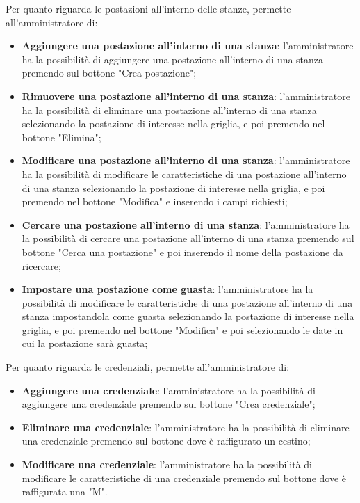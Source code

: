 Per quanto riguarda le postazioni all'interno delle stanze, permette all'amministratore di:
\begin{itemize}
	\item \textbf{Aggiungere una postazione all'interno di una stanza}: l'amministratore ha la possibilità di aggiungere una postazione all'interno di una stanza premendo sul bottone "Crea postazione"; \\
	\item \textbf{Rimuovere una postazione all'interno di una stanza}: l'amministratore ha la possibilità di eliminare una postazione all'interno di una stanza selezionando la postazione di interesse nella griglia, e poi premendo nel bottone "Elimina"; \\
	\item \textbf{Modificare una postazione all'interno di una stanza}:  l'amministratore ha la possibilità di modificare le caratteristiche di una postazione all'interno di una stanza selezionando la postazione di interesse nella griglia, e poi premendo nel bottone "Modifica" e inserendo i campi richiesti; \\
	\item \textbf{Cercare una postazione all'interno di una stanza}: l'amministratore ha la possibilità di cercare una postazione all'interno di una stanza premendo sul bottone "Cerca una postazione" e poi inserendo il nome della postazione da ricercare; \\
	\item \textbf{Impostare una postazione come guasta}:  l'amministratore ha la possibilità di modificare le caratteristiche di una postazione all'interno di una stanza impostandola come guasta selezionando la postazione di interesse nella griglia, e poi premendo nel bottone "Modifica" e poi selezionando le date in cui la postazione sarà guasta; \\
\end{itemize}
Per quanto riguarda le credenziali, permette all'amministratore di:
\begin{itemize}
	\item \textbf{Aggiungere una credenziale}: l'amministratore ha la possibilità di aggiungere una credenziale premendo sul bottone "Crea credenziale"; \\
	\item \textbf{Eliminare una credenziale}: l'amministratore ha la possibilità di eliminare una credenziale premendo sul bottone dove è raffigurato un cestino; \\
	\item \textbf{Modificare una credenziale}:  l'amministratore ha la possibilità di modificare le caratteristiche di una credenziale premendo sul bottone dove è raffigurata una "M". \\
\end{itemize}

